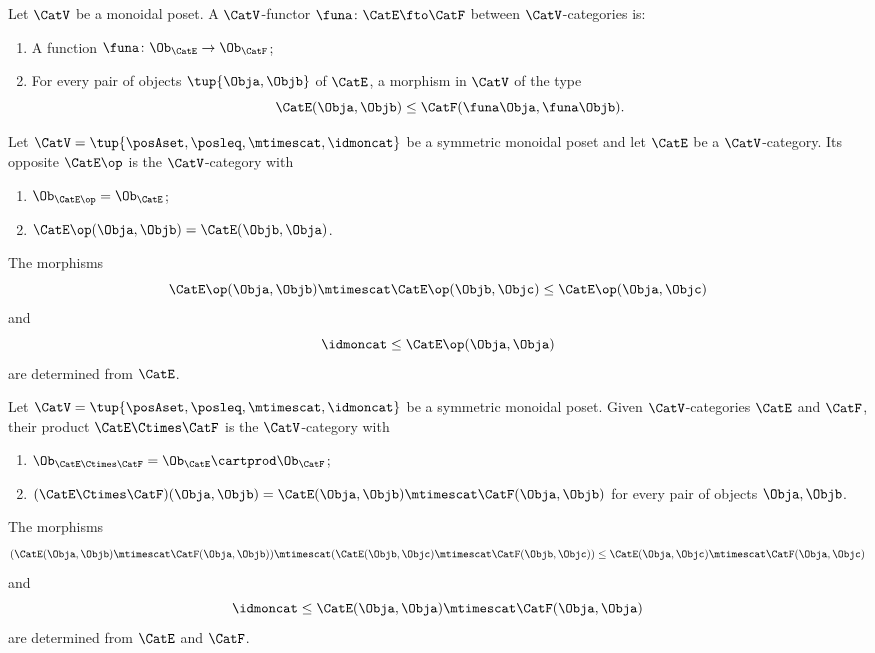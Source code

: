 \begin{ctdefinition}
\label{def:functor-monoidal-poset-enriched}
Let $\CatV$ be a monoidal poset. A $\CatV$-functor $\funa \colon \CatE \fto \CatF$ between $\CatV$-categories is:

\constit
\begin{enumerate}
\item A function $\funa \colon \Ob_\CatE \to \Ob_\CatF$;
\item For every pair of objects $\tup{\Obja, \Objb}$ of $\CatE$, a morphism in $\CatV$ of the type
\begin{equation}
\CatE(\Obja, \Objb) \leq \CatF(\funa \Obja, \funa \Objb). 
\end{equation}
\end{enumerate}
\end{ctdefinition}


\begin{ctdefinition}
\label{def:monoidal-poset-cat-op}
Let $\CatV = \tup{\posAset, \posleq, \mtimescat, \idmoncat}$ be a symmetric monoidal poset and let $\CatE$ be a $\CatV$-category. Its opposite $\CatE\op$ is the $\CatV$-category with 
\begin{enumerate}
\item $\Ob_{\CatE\op} = \Ob_\CatE$;
\item $\CatE\op(\Obja, \Objb) = \CatE(\Objb, \Obja)$.
\end{enumerate}

The morphisms 
\begin{equation}
\CatE\op(\Obja, \Objb) \mtimescat \CatE\op(\Objb, \Objc) \leq \CatE\op(\Obja, \Objc)
\end{equation}
and
\begin{equation}
\idmoncat \leq \CatE\op(\Obja, \Obja)
\end{equation}
are determined from $\CatE$.
\end{ctdefinition}

\begin{ctdefinition}
\label{def:monoidal-poset-cat-product}
Let $\CatV = \tup{\posAset, \posleq, \mtimescat, \idmoncat}$ be a symmetric monoidal poset. Given $\CatV$-categories $\CatE$ and $\CatF$, their product $\CatE \Ctimes \CatF$ is the $\CatV$-category with 
\begin{enumerate}
\item $\Ob_{\CatE \Ctimes \CatF} = \Ob_\CatE \cartprod \Ob_\CatF$;
\item $(\CatE \Ctimes \CatF)(\Obja, \Objb) = \CatE (\Obja, \Objb) \mtimescat \CatF (\Obja, \Objb)$ for every pair of objects $\Obja, \Objb$. 
\end{enumerate}
The morphisms 
\begin{equation}
(\CatE(\Obja, \Objb) \mtimescat \CatF(\Obja, \Objb)) \mtimescat (\CatE(\Objb, \Objc) \mtimescat \CatF(\Objb, \Objc)) \leq \CatE(\Obja, \Objc) \mtimescat  \CatF(\Obja, \Objc)
\end{equation}
and
\begin{equation}
\idmoncat \leq \CatE(\Obja, \Obja) \mtimescat \CatF(\Obja, \Obja)
\end{equation}
are determined from $\CatE$ and $\CatF$.
\end{ctdefinition}


